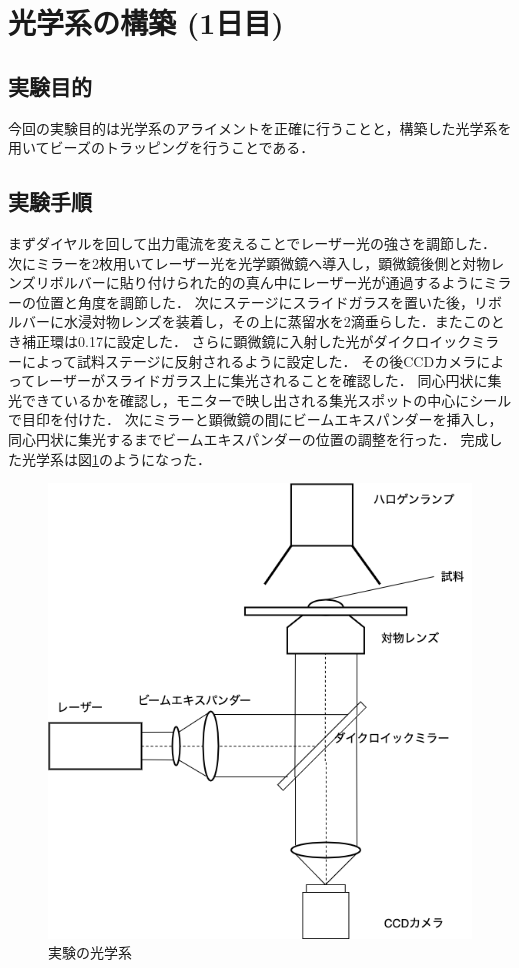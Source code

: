 \documentclass[11pt, a4paper,twocolumn]{jarticle}
\begin{document}
\section{光学系の構築 (1日目)}
\subsection{実験目的}
今回の実験目的は光学系のアライメントを正確に行うことと，構築した光学系を用いてビーズのトラッピングを行うことである．

\subsection{実験手順}
まずダイヤルを回して出力電流を変えることでレーザー光の強さを調節した．
次にミラーを2枚用いてレーザー光を光学顕微鏡へ導入し，顕微鏡後側と対物レンズリボルバーに貼り付けられた的の真ん中にレーザー光が通過するようにミラーの位置と角度を調節した．
次にステージにスライドガラスを置いた後，リボルバーに水浸対物レンズを装着し，その上に蒸留水を2滴垂らした．またこのとき補正環は0.17に設定した．
さらに顕微鏡に入射した光がダイクロイックミラーによって試料ステージに反射されるように設定した．
その後CCDカメラによってレーザーがスライドガラス上に集光されることを確認した．
同心円状に集光できているかを確認し，モニターで映し出される集光スポットの中心にシールで目印を付けた．
次にミラーと顕微鏡の間にビームエキスパンダーを挿入し，同心円状に集光するまでビームエキスパンダーの位置の調整を行った．
完成した光学系は図\ref{fig:1}のようになった．

\begin{figure}[htbp]
 \begin{center}
  \includegraphics[width=0.8\linewidth]{fig1.png}
 \end{center}
 \caption{実験の光学系}
 \label{fig:1}
\end{figure}
\end{document}
